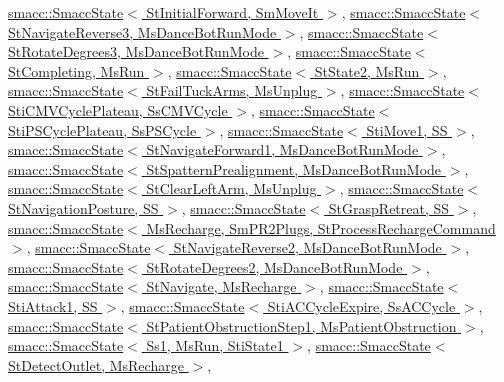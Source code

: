 \hyperlink{classsmacc_1_1SmaccState_afc39f8e0ca4001b2159a100da2fccd0e}{smacc\+::\+Smacc\+State$<$ St\+Initial\+Forward, Sm\+Move\+It $>$}, \hyperlink{classsmacc_1_1SmaccState_afc39f8e0ca4001b2159a100da2fccd0e}{smacc\+::\+Smacc\+State$<$ St\+Navigate\+Reverse3, Ms\+Dance\+Bot\+Run\+Mode $>$}, \hyperlink{classsmacc_1_1SmaccState_afc39f8e0ca4001b2159a100da2fccd0e}{smacc\+::\+Smacc\+State$<$ St\+Rotate\+Degrees3, Ms\+Dance\+Bot\+Run\+Mode $>$}, \hyperlink{classsmacc_1_1SmaccState_afc39f8e0ca4001b2159a100da2fccd0e}{smacc\+::\+Smacc\+State$<$ St\+Completing, Ms\+Run $>$}, \hyperlink{classsmacc_1_1SmaccState_afc39f8e0ca4001b2159a100da2fccd0e}{smacc\+::\+Smacc\+State$<$ St\+State2, Ms\+Run $>$}, \hyperlink{classsmacc_1_1SmaccState_afc39f8e0ca4001b2159a100da2fccd0e}{smacc\+::\+Smacc\+State$<$ St\+Fail\+Tuck\+Arms, Ms\+Unplug $>$}, \hyperlink{classsmacc_1_1SmaccState_afc39f8e0ca4001b2159a100da2fccd0e}{smacc\+::\+Smacc\+State$<$ Sti\+C\+M\+V\+Cycle\+Plateau, Ss\+C\+M\+V\+Cycle $>$}, \hyperlink{classsmacc_1_1SmaccState_afc39f8e0ca4001b2159a100da2fccd0e}{smacc\+::\+Smacc\+State$<$ Sti\+P\+S\+Cycle\+Plateau, Ss\+P\+S\+Cycle $>$}, \hyperlink{classsmacc_1_1SmaccState_afc39f8e0ca4001b2159a100da2fccd0e}{smacc\+::\+Smacc\+State$<$ Sti\+Move1, S\+S $>$}, \hyperlink{classsmacc_1_1SmaccState_afc39f8e0ca4001b2159a100da2fccd0e}{smacc\+::\+Smacc\+State$<$ St\+Navigate\+Forward1, Ms\+Dance\+Bot\+Run\+Mode $>$}, \hyperlink{classsmacc_1_1SmaccState_afc39f8e0ca4001b2159a100da2fccd0e}{smacc\+::\+Smacc\+State$<$ St\+Spattern\+Prealignment, Ms\+Dance\+Bot\+Run\+Mode $>$}, \hyperlink{classsmacc_1_1SmaccState_afc39f8e0ca4001b2159a100da2fccd0e}{smacc\+::\+Smacc\+State$<$ St\+Clear\+Left\+Arm, Ms\+Unplug $>$}, \hyperlink{classsmacc_1_1SmaccState_afc39f8e0ca4001b2159a100da2fccd0e}{smacc\+::\+Smacc\+State$<$ St\+Navigation\+Posture, S\+S $>$}, \hyperlink{classsmacc_1_1SmaccState_afc39f8e0ca4001b2159a100da2fccd0e}{smacc\+::\+Smacc\+State$<$ St\+Grasp\+Retreat, S\+S $>$}, \hyperlink{classsmacc_1_1SmaccState_afc39f8e0ca4001b2159a100da2fccd0e}{smacc\+::\+Smacc\+State$<$ Ms\+Recharge, Sm\+P\+R2\+Plugs, St\+Process\+Recharge\+Command $>$}, \hyperlink{classsmacc_1_1SmaccState_afc39f8e0ca4001b2159a100da2fccd0e}{smacc\+::\+Smacc\+State$<$ St\+Navigate\+Reverse2, Ms\+Dance\+Bot\+Run\+Mode $>$}, \hyperlink{classsmacc_1_1SmaccState_afc39f8e0ca4001b2159a100da2fccd0e}{smacc\+::\+Smacc\+State$<$ St\+Rotate\+Degrees2, Ms\+Dance\+Bot\+Run\+Mode $>$}, \hyperlink{classsmacc_1_1SmaccState_afc39f8e0ca4001b2159a100da2fccd0e}{smacc\+::\+Smacc\+State$<$ St\+Navigate, Ms\+Recharge $>$}, \hyperlink{classsmacc_1_1SmaccState_afc39f8e0ca4001b2159a100da2fccd0e}{smacc\+::\+Smacc\+State$<$ Sti\+Attack1, S\+S $>$}, \hyperlink{classsmacc_1_1SmaccState_afc39f8e0ca4001b2159a100da2fccd0e}{smacc\+::\+Smacc\+State$<$ Sti\+A\+C\+Cycle\+Expire, Ss\+A\+C\+Cycle $>$}, \hyperlink{classsmacc_1_1SmaccState_afc39f8e0ca4001b2159a100da2fccd0e}{smacc\+::\+Smacc\+State$<$ St\+Patient\+Obstruction\+Step1, Ms\+Patient\+Obstruction $>$}, \hyperlink{classsmacc_1_1SmaccState_afc39f8e0ca4001b2159a100da2fccd0e}{smacc\+::\+Smacc\+State$<$ Ss1, Ms\+Run, Sti\+State1 $>$}, \hyperlink{classsmacc_1_1SmaccState_afc39f8e0ca4001b2159a100da2fccd0e}{smacc\+::\+Smacc\+State$<$ St\+Detect\+Outlet, Ms\+Recharge $>$}, 